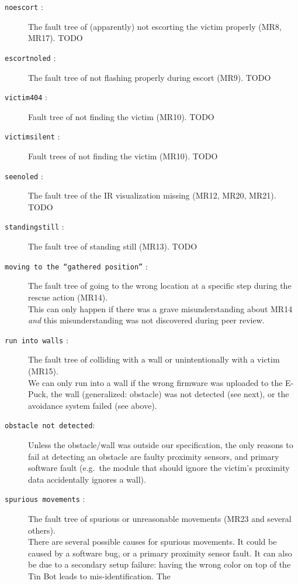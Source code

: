 \documentclass[a4paper,parskip,headheight=38pt]{scrartcl} %
\begin{document}
\begin{description}
\item[\texttt{noescort} :]
    The fault tree of (apparently) not escorting the victim properly
    (MR8, MR17). TODO
\item[\texttt{escortnoled} :]
    The fault tree of not flashing properly during escort (MR9). TODO
\item[\texttt{victim404} :]
    Fault tree of not finding the victim (MR10). TODO
\item[\texttt{victimsilent} :]
    Fault trees of not finding the victim (MR10). TODO
\item[\texttt{seenoled} :]
    The fault tree of the IR visualization missing (MR12, MR20, MR21). TODO
\item[\texttt{standingstill} :]
    The fault tree of standing still (MR13). TODO
\item[\texttt{moving to the \enquote{gathered position}} :]
    The fault tree of going to the wrong location at a specific step
    during the rescue action (MR14).
     \\
    This can only happen if there was a grave misunderstanding about
    MR14 \emph{and} this misunderstanding was not discovered during
    peer review.
\item[\texttt{run into walls} :]
    The fault tree of colliding with a wall or unintentionally with a
    victim (MR15).
     \\
    We can only run into a wall if the wrong firmware was uploaded to
    the E-Puck, the wall (generalized: obstacle) was not detected (see
    next), or the avoidance system failed (see above).
\item[\texttt{obstacle not detected}:]
    Unless the obstacle/wall was outside our specification, the only
    reasons to fail at detecting an obstacle are faulty proximity
    sensors, and primary software fault (e.g.\ the module that should
    ignore the victim's proximity data accidentally ignores a wall).
\item[\texttt{spurious movements} :]
    The fault tree of spurious or unreasonable movements (MR23 and
    several others).
     \\
    There are several possible causes for spurious movements.  It could
    be caused by a software bug, or a primary proximity sensor fault.
    It can also be due to a secondary setup failure: having the wrong
    color on top of the Tin Bot leads to mis-identification.  The

\end{description}
\end{document}
